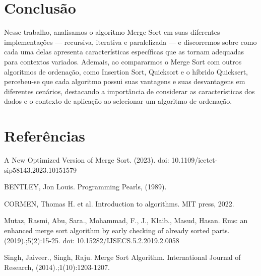 \documentclass[12pt]{article}
\begin{document}
\section{Conclusão}

Nesse trabalho, analisamos o algoritmo Merge Sort em suas diferentes implementações — recursiva, iterativa e paralelizada — e discorremos sobre como cada uma delas apresenta características específicas que as tornam adequadas para contextos variados. Ademais, ao compararmos o Merge Sort com outros algoritmos de ordenação, como Insertion Sort, Quicksort e o híbrido Quicksert, percebeu-se que cada algoritmo possui suas vantagens e suas desvantagens em diferentes cenários, destacando a importância de considerar as características dos dados e o contexto de aplicação ao selecionar um algoritmo de ordenação.

\section{Referências}
\renewcommand{\baselinestretch}{1.5}

\setlength{\parindent}{0pt}

\hangindent=0.5cm
A New Optimized Version of Merge Sort.  (2023). doi: 10.1109/icetet-sip58143.2023.10151579

\hangindent=0.5cm
BENTLEY, Jon Louis. Programming Pearls, (1989).
 
\hangindent=0.5cm
CORMEN, Thomas H. et al. Introduction to algorithms. MIT press, 2022.

\hangindent=0.5cm
Mutaz, Rasmi, Abu, Sara., Mohammad, F., J., Klaib., Masud, Hasan. Ems: an enhanced merge sort algorithm by early checking of already sorted parts.  (2019).;5(2):15-25. doi: 10.15282/IJSECS.5.2.2019.2.0058

\hangindent=0.5cm
Singh, Jaiveer., Singh, Raju. Merge Sort Algorithm. International Journal of Research, (2014).;1(10):1203-1207.
 
 
\end{document}
